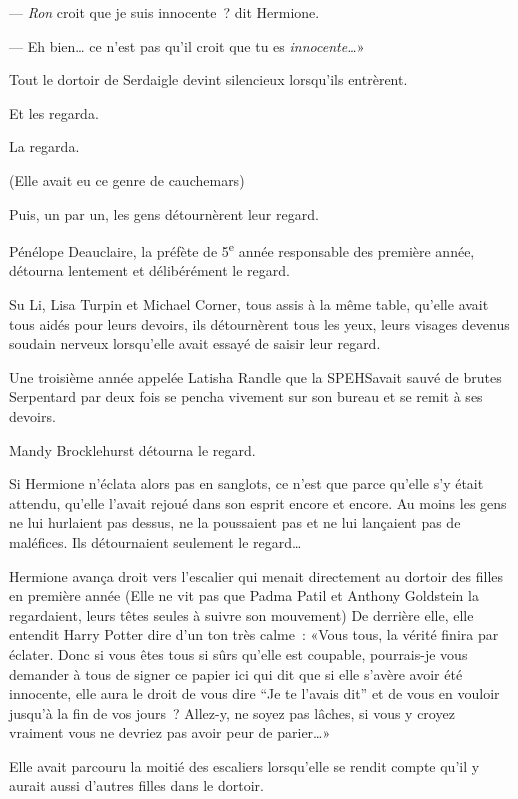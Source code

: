 --- \emph{Ron} croit que je suis innocente~? dit Hermione.

--- Eh bien… ce n'est pas qu'il croit que tu es \emph{innocente…}»

\later

Tout le dortoir de Serdaigle devint silencieux lorsqu'ils entrèrent.

Et les regarda.

La regarda.

(Elle avait eu ce genre de cauchemars)

Puis, un par un, les gens détournèrent leur regard.

Pénélope Deauclaire, la préfète de 5\textsuperscript{e} année responsable des première année, détourna lentement et délibérément le regard.

Su Li, Lisa Turpin et Michael Corner, tous assis à la même table, qu'elle avait tous aidés pour leurs devoirs, ils détournèrent tous les yeux, leurs visages devenus soudain nerveux lorsqu'elle avait essayé de saisir leur regard.

Une troisième année appelée Latisha Randle que la SPEHSavait sauvé de brutes Serpentard par deux fois se pencha vivement sur son bureau et se remit à ses devoirs.

Mandy Brocklehurst détourna le regard.

Si Hermione n'éclata alors pas en sanglots, ce n'est que parce qu'elle s'y était attendu, qu'elle l'avait rejoué dans son esprit encore et encore. Au moins les gens ne lui hurlaient pas dessus, ne la poussaient pas et ne lui lançaient pas de maléfices. Ils détournaient seulement le regard…

Hermione avança droit vers l'escalier qui menait directement au dortoir des filles en première année (Elle ne vit pas que Padma Patil et Anthony Goldstein la regardaient, leurs têtes seules à suivre son mouvement) De derrière elle, elle entendit Harry Potter dire d'un ton très calme~: «Vous tous, la vérité finira par éclater. Donc si vous êtes tous si sûrs qu'elle est coupable, pourrais-je vous demander à tous de signer ce papier ici qui dit que si elle s'avère avoir été innocente, elle aura le droit de vous dire “Je te l'avais dit” et de vous en vouloir jusqu'à la fin de vos jours~? Allez-y, ne soyez pas lâches, si vous y croyez vraiment vous ne devriez pas avoir peur de parier…»

Elle avait parcouru la moitié des escaliers lorsqu'elle se rendit compte qu'il y aurait aussi d'autres filles dans le dortoir.

